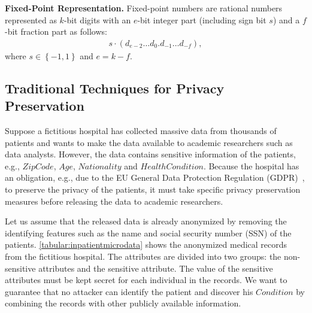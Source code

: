 \textbf{Fixed-Point Representation.}
Fixed-point numbers are rational numbers represented as $k$-bit digits with an $e$-bit integer part (including sign bit $s$) and a $f$-bit fraction part as follows:
\begin{equation}
    \begin{split}
        s \cdot \left(d_{e-2}\ldots d_0. d_{-1}\ldots d_{-f}\right) ,
    \end{split}
\end{equation}
where $s \in \left\{-1,1\right\} $ and $e=k-f$.


\subsection{Traditional Techniques for Privacy Preservation}
\label{subsec:TraditionalTechniquesforPrivacyPreservation}
Suppose a fictitious hospital has collected massive data from thousands of patients and wants to make the data available to academic researchers such as data analysts. However, the data contains sensitive information of the patients, e.g., $Zip Code$, $Age$, $Nationality$ and $Health Condition$. Because the hospital has an obligation, e.g., due to the EU General Data Protection Regulation (GDPR)~\cite{voigt2017eu}, to preserve the privacy of the patients, it must take specific privacy preservation measures before releasing the data to academic researchers.

Let us assume that the released data is already anonymized by removing the identifying features such as the name and social security number (SSN) of the patients.
\autoref{tabular:inpatientmicrodata} shows the anonymized medical records from the fictitious hospital. The attributes are divided into two groups: the non-sensitive attributes and the sensitive attribute. The value of the sensitive attributes must be kept secret for each individual in the records. We want to guarantee that no attacker can identify the patient and discover his $Condition$ by combining the records with other publicly available information.

